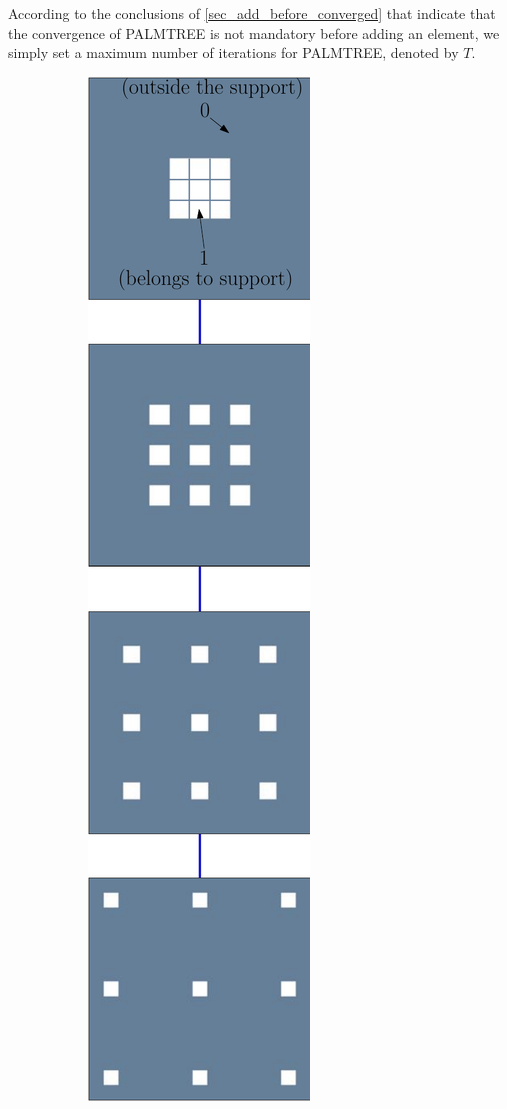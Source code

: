 \noindent
According to the conclusions of \cref{sec_add_before_converged} that indicate that the convergence of \ac{PALMTREE} is not mandatory before adding an element, we simply set a maximum number of iterations for \ac{PALMTREE}, denoted by $T$.

\begin{figure}[!ht]\centering
\begin{subfigure}[b]{0.085\textwidth}\centering
	\includegraphics[width=\textwidth]{figures/exple-better-support/tree_classic.pdf}

\end{subfigure}
\end{figure}

